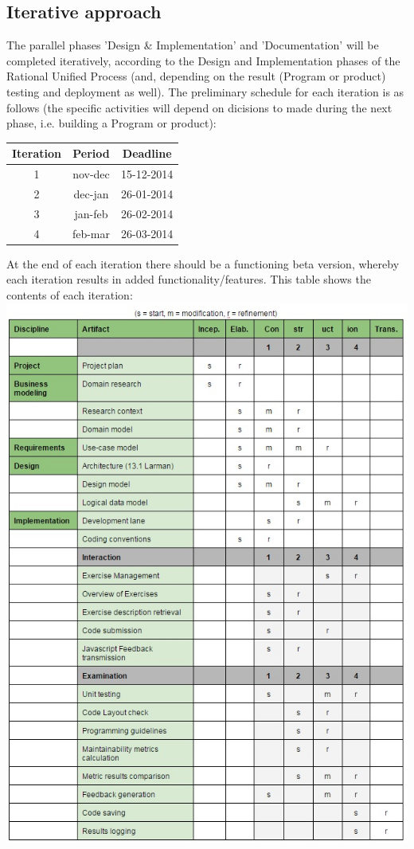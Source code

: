 \documentclass{article}
\begin{document}
\subsection{Iterative approach}
The parallel phases 'Design \& Implementation' and 'Documentation' will be
completed iteratively, according to the Design and Implementation phases of the
Rational Unified Process (and, depending on the result (Program or product)
testing and deployment as well). The preliminary schedule for each iteration is
as follows (the specific activities will depend on dicisions to made during the
next phase, i.e. building a Program or product):

\begin{tabular}{ c | c || c  }
  \hline			
  Iteration & Period & Deadline \\ \hline \hline
  1 & nov-dec & 15-12-2014 \\ \hline
  2 & dec-jan & 26-01-2014 \\ \hline
  3 & jan-feb & 26-02-2014 \\ \hline
  4 & feb-mar & 26-03-2014 \\ \hline
  \hline  
\end{tabular}
\newline\newline
At the end of each iteration there should be a functioning beta version,
whereby each iteration results in added functionality/features. This table shows the contents of each iteration:
\newline
\includegraphics[scale=0.8]{iterations}
\end{document}
